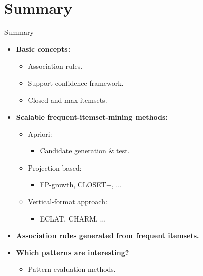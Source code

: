 \section{Summary}

\begin{frame}{Summary}
	\begin{itemize}
		\item \textbf{Basic concepts:}
		      \begin{itemize}
			      \item Association rules.
			      \item Support-confidence framework.
			      \item Closed and max-itemsets.
		      \end{itemize}
		\item \textbf{Scalable frequent-itemset-mining methods:}
		      \begin{itemize}
			      \item Apriori:
			            \begin{itemize}
				            \item Candidate generation \& test.
			            \end{itemize}
			      \item Projection-based:
			            \begin{itemize}
				            \item FP-growth, CLOSET+, $\ldots$
			            \end{itemize}
			      \item Vertical-format approach:
			            \begin{itemize}
				            \item ECLAT, CHARM, $\ldots$
			            \end{itemize}
		      \end{itemize}
		\item \textbf{Association rules generated from frequent
			      itemsets.}
		\item \textbf{Which patterns are interesting?}
		      \begin{itemize}
			      \item Pattern-evaluation methods.
		      \end{itemize}
	\end{itemize}
\end{frame}
